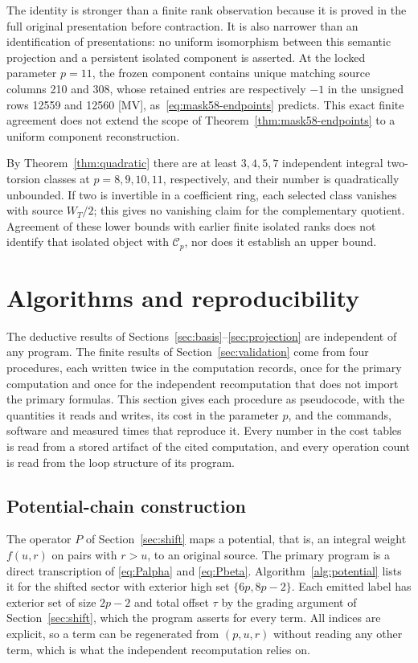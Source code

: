 \documentclass[11pt]{article}
\theoremstyle{definition}
\theoremstyle{remark}
\begin{document}
The identity is stronger than a finite rank observation because it is proved
in the full original presentation before contraction. It is also narrower
than an identification of presentations: no uniform isomorphism between this
semantic projection and a persistent isolated component is asserted. At the
locked parameter $p=11$, the frozen component contains unique matching source
columns 210 and 308, whose retained entries are respectively $-1$ in the
unsigned rows 12559 and 12560 [MV], as~\eqref{eq:mask58-endpoints} predicts. This exact finite agreement does not extend the scope of
Theorem~\ref{thm:mask58-endpoints} to a uniform component reconstruction.

By Theorem~\ref{thm:quadratic} there are at least $3,4,5,7$ independent integral
two-torsion classes at $p=8,9,10,11$, respectively, and their number
is quadratically unbounded. If two is invertible in a coefficient ring,
each selected class vanishes with source $W_T/2$; this gives no vanishing
claim for the complementary quotient. Agreement of these lower bounds
with earlier finite isolated ranks does not identify that isolated object
with $\mathcal C_p$, nor does it establish an upper bound.

\section{Algorithms and reproducibility}\label{sec:algorithms}

The deductive results of Sections~\ref{sec:basis}--\ref{sec:projection} are
independent of any program. The finite results of Section~\ref{sec:validation}
come from four procedures, each written twice in the computation records, once
for the primary computation and once for the independent recomputation that does
not import the primary formulas. This section gives each procedure as
pseudocode, with the quantities it reads and writes, its cost in the parameter
$p$, and the commands, software and measured times that reproduce it. Every
number in the cost tables is read from a stored artifact of the cited
computation, and every operation count is read from the loop structure of its
program.

\subsection{Potential-chain construction}

The operator $P$ of Section~\ref{sec:shift} maps a potential, that is, an
integral weight $f(u,r)$ on pairs with $r>u$, to an original source. The
primary program is a direct transcription of \eqref{eq:Palpha} and
\eqref{eq:Pbeta}. Algorithm~\ref{alg:potential} lists it for the shifted
sector with exterior high set $\{6p,8p-2\}$. Each emitted label has exterior set
of size $2p-2$ and total offset $\tau$ by the grading argument of
Section~\ref{sec:shift}, which the program asserts for every term. All indices
are explicit, so a term can be regenerated from $(p,u,r)$ without reading any
other term, which is what the independent recomputation relies on.
\end{document}
